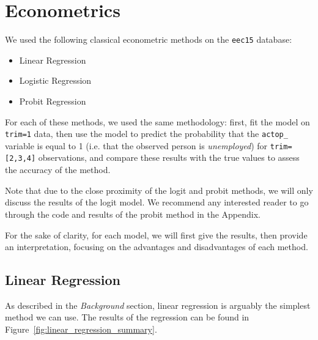 \section{Econometrics}
We used the following classical econometric methods on the \texttt{eec15} database:

\begin{itemize}
    \item Linear Regression
    \item Logistic Regression
    \item Probit Regression
\end{itemize}

For each of these methods, we used the same methodology: first, fit the model on \texttt{trim=1} data, then use the model to predict the probability that the \texttt{actop\_} variable is equal to 1 (i.e. that the observed person is \textit{unemployed}) for \texttt{trim=[2,3,4]} observations, and compare these results with the true values to assess the accuracy of the method.

Note that due to the close proximity of the logit and probit methods, we will only discuss the results of the logit model. We recommend any interested reader to go through the code and results of the probit method in the Appendix.

For the sake of clarity, for each model, we will first give the results, then provide an interpretation, focusing on the advantages and disadvantages of each method.

\subsection{Linear Regression}
As described in the \textit{Background} section, linear regression is arguably the simplest method we can use. The results of the regression can be found in Figure~\ref{fig:linear_regression_summary}.

